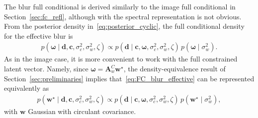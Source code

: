 \documentclass[12pt]{article}
\begin{document}
The blur full conditional is derived similarly to the image full conditional in Section~\ref{sec:fc_refl}, although with the spectral representation is not obvious. 
From the posterior density in~\eqref{eq:posterior_cyclic}, the full conditional density for the effective blur is
\begin{align}
\label{eq:FC_blur_effective}
p(\bm{\omega}\mid \bm{d}, \bm{c}, \sigma_c^2, \sigma_w^2, \zeta)
\propto
p(\bm{d}\mid \bm{c}, \bm{\omega}, \sigma_c^2, \sigma_w^2, \zeta)
\, p(\bm{\omega}\mid \sigma_w^2).
\end{align}
As in the image case, it is more convenient to work with the full constrained latent vector. Namely, since
$\bm{\omega} = \bm{A}_w^C \bm{w}^{\star}$,
the density-equivalence result of Section~\ref{sec:preliminaries} implies that~\eqref{eq:FC_blur_effective} can be represented equivalently as
\begin{align}
\label{eq:FC_blur_extended}
p(\bm{w}^{\star}\mid \bm{d}, \bm{c}, \sigma_c^2, \sigma_w^2, \zeta)
\propto
p(\bm{d}\mid \bm{c}, \bm{\omega}, \sigma_c^2, \sigma_w^2, \zeta)
\, p(\bm{w}^{\star}\mid \sigma_w^2),
\end{align}
with $\bm{w}$ Gaussian with circulant covariance.
\end{document}
